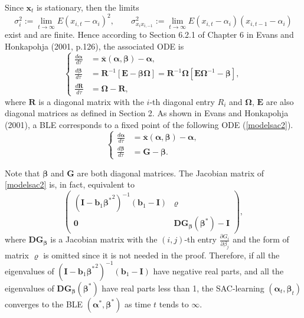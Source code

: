 \begin{appendix}
 Since ${\pmb x}_t$ is
stationary, then the limits
$$\sigma^2_i:=\lim_{t\to\infty}E(x_{i,t}-\alpha_i)^2,\quad\quad \sigma_{x_ix_{i,-1}}^2:=\lim_{t\to\infty}E(x_{i,t}-\alpha_i)(x_{i,t-1}-\alpha_i)$$
exist and are finite. Hence according to Section 6.2.1 of Chapter 6
in Evans and Honkapohja (2001, p.126), the associated ODE is
\begin{equation}\label{modelsac}
    \left\{
    \begin{split}
           \frac{d\pmb\alpha}{d\tau}&=\overline{\pmb{x}}(\pmb\alpha,\pmb\beta)-\pmb\alpha, \\
\frac{d\pmb\beta}{d\tau}&={\pmb R}^{-1}[{\pmb E}-\pmb{\beta \Omega}]={\pmb R}^{-1}{\pmb \Omega}[{\pmb E}{\pmb \Omega}^{-1}-\pmb{\beta}],\\
\frac{d {\pmb R}}{d\tau}&={\pmb \Omega}-{\pmb R},
    \end{split}
    \right.
    \end{equation}
    where $\pmb R$ is a diagonal matrix with the $i$-th diagonal entry $R_i$ and $\pmb \Omega$, $\pmb E$ are also diagonal matrices as defined in Section 2.  As shown in Evans and Honkapohja (2001), a BLE corresponds to a fixed point of the following ODE
(\ref{modelsac2}).
\begin{equation}\label{modelsac2}
    \left\{
    \begin{split}
           \frac{d\pmb\alpha}{d\tau}&=\overline{\pmb{x}}(\pmb\alpha,\pmb\beta)-\pmb\alpha, \\
\frac{d\pmb\beta}{d\tau}&={\pmb G}-\pmb{\beta}.
    \end{split}
    \right.
    \end{equation}
    
    Note that $\pmb\beta$ and $\pmb G$ are both diagonal matrices. The Jacobian matrix of \ref{modelsac2} is, in fact, equivalent to
$$\left(\begin{array}{cc}
({\pmb I}-{\pmb b_1}{{\pmb \beta}^*}^2)^{-1}({\pmb b}_1-{\pmb I})& \pmb\varrho\\
 \pmb 0&{\pmb D}{\pmb G}_{\pmb\beta}(\pmb\beta^*)-\pmb I
 \end{array}\right),$$
 where ${\pmb D}{\pmb G}_{\pmb\beta}$ is a Jacobian matrix with the $(i,j)$-th entry $\frac{\partial G_i}{\partial\beta_j}$ and the form of matrix $\pmb\varrho$ is omitted since it is not needed in the proof. Therefore, if all the eigenvalues of $({\pmb I}-{\pmb b_1}{{\pmb \beta}^*}^2)^{-1}({\pmb b}_1-{\pmb I})$ have negative real parts, and all the eigenvalues of ${\pmb D}{\pmb G}_{\pmb\beta}(\pmb\beta^*)$ have real parts less than 1, the SAC-learning
$({\pmb\alpha}_t,{\pmb\beta}_t)$ converges to the BLE $({\pmb\alpha}^*, {\pmb\beta}^*)$ as time $t$ tends to $\infty$.
\begin{comment}

\end{comment}
\end{appendix}
